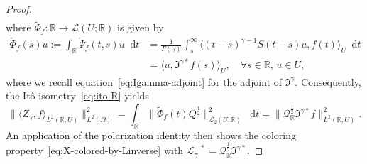 \documentclass[reqno]{amsart}
\numberwithin{equation}{section}
\newcommand{\bbR}{\mathbb{R}}
\newcommand{\cL}{\mathcal{L}}
\newcommand{\cQ}{\mathcal{Q}}
\newcommand{\norm}[2]{     \| #1       \|_{ #2 }}
\newcommand{\scalar}[2]{     \langle #1       \rangle_{ #2 }}
\newcommand{\rd}{\mathop{}\!\mathrm{d}}
\newcommand{\from}{\colon}
\newcommand{\LO}{\mathscr L}
\theoremstyle{remark}
\theoremstyle{definition}
\begin{document}
\begin{proof}
\begin{align}
	\end{align}
	where $\widetilde \Phi_f \from \bbR \to \LO(U; \bbR)$ is given by 
	\begin{align}
		\widetilde \Phi_f(s)u 
		:= 
		\int_\bbR \widetilde \Psi_f(t,s) u \rd t
		&=
		\frac{1}{\Gamma(\gamma)}
		\int_{s}^\infty
		\scalar{(t-s)^{\gamma-1} S(t-s) u, f(t)}{U}\rd t
		\\
		&=
		\scalar{u, \mathfrak I^{\gamma*} f(s)}{U},
		\quad 
		\forall
		s \in \bbR,\,  u \in U,
	\end{align}
	where we recall equation~\eqref{eq:Igamma-adjoint} for the adjoint of $\mathfrak I^\gamma$.
	Consequently, the It\^o isometry~\eqref{eq:ito-R} yields
	\begin{equation}
		\norm{\scalar{Z_\gamma, f}{L^2(\bbR; U)}}{L^2(\Omega)}^2
		=
		\int_\bbR \norm{\widetilde \Phi_f(t) Q^\frac{1}{2}}{\LO_2(U; \bbR)}^2 \rd t
		=
		\norm{\cQ_\bbR^\frac{1}{2} \mathfrak I^{\gamma*} f}{L^2(\bbR; U)}^2.
	\end{equation}
	An application of the polarization identity then shows
	the coloring property~\eqref{eq:X-colored-by-Linverse}
	with $\cL^{-*}_\gamma = \cQ_\bbR^\frac{1}{2} \mathfrak I^{\gamma*}$.
\end{proof}
\end{document}
